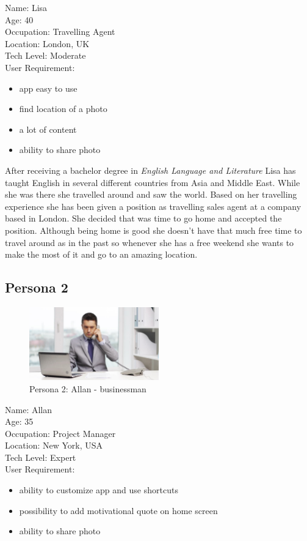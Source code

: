 \documentclass[version=last,fontsize=13pt]{scrartcl}
\begin{document}
\noindent
Name: Lisa \\
Age: 40 \\
Occupation: Travelling Agent \\
Location: London, UK \\
Tech Level: Moderate \\
User Requirement: 
	\begin{itemize}
		\item  app easy to use
		\item  find location of a photo
		\item a lot of content
		\item  ability to share photo 
	\end{itemize}

 After receiving a bachelor degree in \textit{English Language and Literature} Lisa has taught English in several different countries from Asia and Middle East. While she was there she travelled around and saw the world. Based on her travelling experience she has been given a position as travelling sales agent at a company based in London. She decided that was time to go home and accepted the position. Although being home is good she doesn't have that much free time to travel around as in the past so whenever she has a free weekend she wants to make the most of it and go to an amazing location.

\subsection{Persona 2}

\begin{figure}
		
	\centering
	\includegraphics[width = 0.5\textwidth]{imgs/Alan.jpg}
	\caption*{Persona 2: Allan - businessman}


\end{figure}

\noindent
Name: Allan\\
Age: 35\\
Occupation: Project Manager\\
Location: New York, USA\\
Tech Level: Expert\\
User Requirement:
	\begin{itemize}
		\item ability to customize app and use shortcuts
		\item possibility to add motivational quote on home screen
		\item ability to share photo
	\end{itemize}
\end{document}
